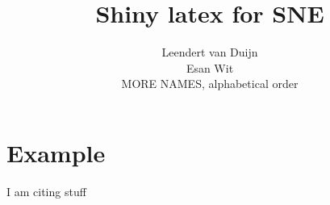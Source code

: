 \documentclass[a4paper,11pt] {article}
\title{Shiny latex for SNE}
\author{
Leendert van Duijn\\
Esan Wit\\
MORE NAMES, alphabetical order\\}
\begin{document}
\maketitle
\newpage






\appendix




\section{Example}
I am citing stuff \cite{chase.92.sigops}
\end{document}
